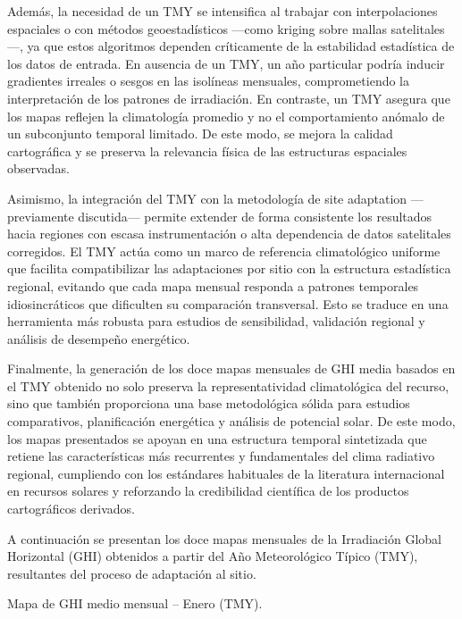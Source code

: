 \documentclass[letterpaper,12pt, twoside]{report}
\providecommand{\DIFdeltex}[1]{{\protect\color{red} \scriptsize #1}} %
\providecommand{\DIFdelFL}[1]{\DIFdel{#1}} %
\providecommand{\DIFdel}[1]{\texorpdfstring{\DIFdeltex{#1}}{}} %
\begin{document}
\DIFdel{Además, la necesidad de un TMY se intensifica al trabajar con interpolaciones espaciales o con métodos geoestadísticos —como kriging sobre mallas satelitales—, ya que estos algoritmos dependen críticamente de la estabilidad estadística de los datos de entrada. En ausencia de un TMY, un año particular podría inducir gradientes irreales o sesgos en las isolíneas mensuales, comprometiendo la interpretación de los patrones de irradiación. En contraste, un TMY asegura que los mapas reflejen la climatología promedio y no el comportamiento anómalo de un subconjunto temporal limitado. De este modo, se mejora la calidad cartográfica y se preserva la relevancia física de las estructuras espaciales observadas.
}%

\DIFdel{Asimismo, la integración del TMY con la metodología de site adaptation —previamente discutida— permite extender de forma consistente los resultados hacia regiones con escasa instrumentación o alta dependencia de datos satelitales corregidos. El TMY actúa como un marco de referencia climatológico uniforme que facilita compatibilizar las adaptaciones por sitio con la estructura estadística regional, evitando que cada mapa mensual responda a patrones temporales idiosincráticos que dificulten su comparación transversal. Esto se traduce en una herramienta más robusta para estudios de sensibilidad, validación regional y análisis de desempeño energético.
}%

\DIFdel{Finalmente, la generación de los doce mapas mensuales de GHI media basados en el TMY obtenido no solo preserva la representatividad climatológica del recurso, sino que también proporciona una base metodológica sólida para estudios comparativos, planificación energética y análisis de potencial solar. De este modo, los mapas presentados se apoyan en una estructura temporal sintetizada que retiene las características más recurrentes y fundamentales del clima radiativo regional, cumpliendo con los estándares habituales de la literatura internacional en recursos solares y reforzando la credibilidad científica de los productos cartográficos derivados.
}%

\DIFdel{A continuación se presentan los doce mapas mensuales de la Irradiación Global Horizontal (GHI) obtenidos a partir del Año Meteorológico Típico (TMY), resultantes del proceso de adaptación al sitio.
}%

{%
\DIFdelFL{Mapa de GHI medio mensual – Enero (TMY).}}
\end{document}
